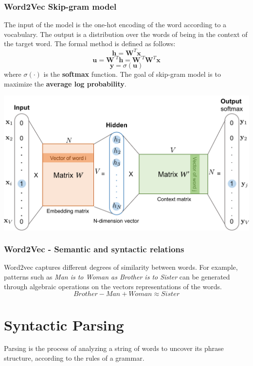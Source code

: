 \subsubsection{Word2Vec Skip-gram model}
The input of the model is the one-hot encoding of the word according to a vocabulary.
The output is a distribution over the words of being in the context of the target word. The formal method is defined as follows:
\[\textbf{h} = \textbf{W}^{T}\textbf{x}\]
\[\textbf{u} = \textbf{W}^{'T}\textbf{h} = \textbf{W}^{'T}\textbf{W}^{T}\textbf{x}\]
\[\textbf{y} = \sigma(\textbf{u})\]
where $\sigma(\cdot)$ is the \textbf{softmax} function.\newline\newline
The goal of skip-gram model is to maximize the \textbf{average log probability}.
\begin{center}
    \includegraphics[scale = 0.3]{images/skip-gram.png}
\end{center}

\subsubsection{Word2Vec - Semantic and syntactic relations}
Word2vec captures different degrees of similarity between words. For example, patterns such as \textit{Man is to Woman as Brother is to Sister} can be generated through algebraic operations on the vectors representations of the words.
\[Brother - Man + Woman \approx Sister\]


\section{Syntactic Parsing}
Parsing is the process of analyzing a string of words to uncover its phrase structure, according
to the rules of a grammar.

